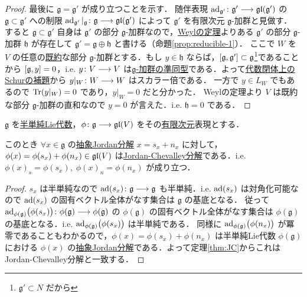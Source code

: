 \documentclass[rep_main]{subfiles}
\begin{document}
\begin{proof}
	最後に $\mathfrak{g} = \mathfrak{g}'$ が成り立つことを示す．
	随伴表現 $\operatorname{ad}_{\mathfrak{g}'} \colon \mathfrak{g}' \longrightarrow \mathfrak{gl} (\mathfrak{g}')$ の $\mathfrak{g} \subset \mathfrak{g}'$ への制限 $\operatorname{ad}_{\mathfrak{g}'}|_{\mathfrak{g}} \colon \mathfrak{g} \longrightarrow \mathfrak{gl}(\mathfrak{g}')$ によって $\mathfrak{g}'$ を有限次元 $\mathfrak{g}$-加群と見做す．
	すると $\mathfrak{g} \subset \mathfrak{g}'$ 自身は $\mathfrak{g}'$ の部分 $\mathfrak{g}$-加群なので，\hyperref[thm:Weyl]{Weylの定理}よりある $\mathfrak{g}'$ の部分 $\mathfrak{g}$-加群 $\mathfrak{h}$ が存在して $\mathfrak{g}' = \mathfrak{g} \oplus \mathfrak{h}$ と書ける（命題\ref{prop:reducible-1}）．
	ここで $W$ を $V$ の任意の\hyperref[def:irr]{既約}な部分 $\mathfrak{g}$-加群とする．もし $y \in \mathfrak{h}$ ならば，$\comm{\mathfrak{g}}{\mathfrak{g}'} \subset \mathfrak{g}$\footnote{$\mathfrak{g}' \subset N$ だから}であることから $\comm{\mathfrak{g}}{y} = 0$，i.e. $y \colon V \longrightarrow V$ は\hyperref[def:g-module-hom]{$\mathfrak{g}$-加群の準同型}である．よって\hyperref[col:Schur-closed]{代数閉体上のSchurの補題}から $y|_W \colon W \longrightarrow W$ はスカラー倍である．
	一方で $y \in L_W$ でもあるので $\Tr(y|_W) = 0$ であり，$y|_W = 0$ だと分かった．
	Weylの定理より $V$ は既約な部分 $\mathfrak{g}$-加群の直和なので $y = 0$ が言えた．i.e. $\mathfrak{h} = 0$ である．

\end{proof}

\begin{mycol}[label=col:JC]{}
	$\mathfrak{g}$ を\hyperref[def:semisimple-LieAlg]{半単純Lie代数}，$\phi \colon \mathfrak{g} \longrightarrow \mathfrak{gl}(V)$ をその\underline{有限次元}表現とする．

	このとき $\forall x \in \mathfrak{g}$ の\hyperref[def:abstruct-JC]{抽象Jordan分解} $x = s_x + n_x$ に対して，$\phi(x) = \phi(s_x) + \phi(n_x) \in \mathfrak{gl}(V)$ は\hyperref[prop:Jordan-Chevalley]{Jordan-Chevalley分解}である．i.e. $\phi(x)_s = \phi(s_x),\; \phi(x)_n = \phi(n_x)$ が成り立つ．
\end{mycol}

\begin{proof}
	$s_x$ は半単純なので $\operatorname{ad} (s_x) \colon \mathfrak{g} \longrightarrow \mathfrak{g}$ も半単純．i.e. $\operatorname{ad}(s_x)$ は対角化可能なので $\operatorname{ad}(s_x)$ の固有ベクトル全体がなす集合は $\mathfrak{g}$ の基底となる．
	従って $\operatorname{ad}_{\phi(\mathfrak{g})} \bigl( \phi(s_x) \bigr) \colon \phi(\mathfrak{g}) \longrightarrow \phi(\mathfrak{g})$ の $\phi(\mathfrak{g})$ の固有ベクトル全体がなす集合は $\phi(\mathfrak{g})$ の基底となる．i.e. $\operatorname{ad}_{\phi(\mathfrak{g})} \bigl( \phi(s_x) \bigr)$ は半単純である．
	同様に $\operatorname{ad}_{\phi(\mathfrak{g})} \bigl( \phi(n_x) \bigr)$ が冪零であることもわかるので，$\phi(x) = \phi(s_x) + \phi(n_x)$ は半単純Lie代数 $\phi(\mathfrak{g})$ における $\phi(x)$ の\hyperref[def:abstruct-JC]{抽象Jordan分解}である．よって定理\ref{thm:JC}からこれはJordan-Chevalley分解と一致する．
\end{proof}
\end{document}

